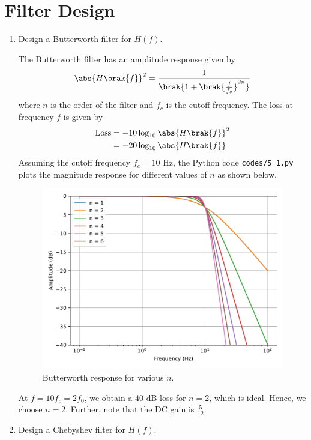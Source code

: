 \documentclass[journal,12pt,twocolumn]{IEEEtran}
\renewcommand\thesection{\arabic{section}}
\begin{document}
\section{Filter Design}
\begin{enumerate}[label=\thesection.\arabic*
,ref=\thesection.\theenumi]
\item Design a Butterworth filter for $H(f)$.

\solution The Butterworth filter has an amplitude response
given by
\begin{align}
    \abs{H\brak{f}}^2 = \frac{1}{\brak{1 + \brak{\frac{f}{f_c}}^{2n}}}
\end{align}
where $n$ is the order of the filter and $f_c$ is the cutoff
frequency. The loss at frequency $f$ is given by 
\begin{align}
    \text{Loss} &= -10\log_{10}\abs{H\brak{f}}^2 \\
                &= -20\log_{10}\abs{H\brak{f}}
\end{align}
Assuming the cutoff frequency $f_c = 10$ Hz, the Python code
\texttt{codes/5\_1.py} plots the magnitude response for different 
values of $n$ as shown below.
\begin{figure}[!ht]
    \includegraphics[width=\columnwidth]{figs/5_1.pdf}
    \caption{Butterworth response for various $n$.}
    \label{fig:butter-resp}
\end{figure}
At $f = 10f_c = 2f_0$, we obtain a 40 dB loss for $n = 2$, which is
ideal. Hence, we choose $n = 2$. Further, note that the
DC gain is $\frac{5}{12}$.

\item Design a Chebyshev filter for $H(f)$.


\end{enumerate}
\end{document}

